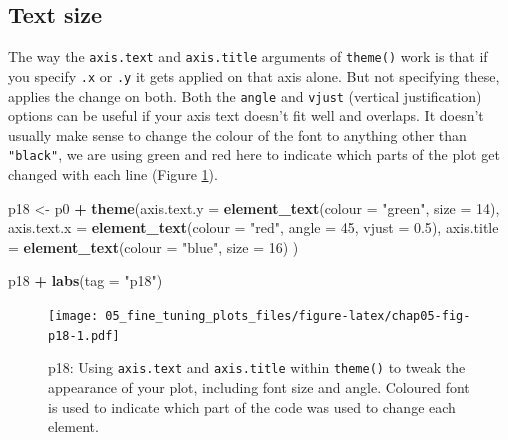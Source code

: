 \documentclass[
  12pt,
  krantz2]{krantz}
\makeatletter
\newenvironment{Shaded}{\begin{snugshade}}{\end{snugshade}}
\newcommand{\DataTypeTok}[1]{\textcolor[rgb]{0.13,0.29,0.53}{#1}}
\newcommand{\DecValTok}[1]{\textcolor[rgb]{0.00,0.00,0.81}{#1}}
\newcommand{\FloatTok}[1]{\textcolor[rgb]{0.00,0.00,0.81}{#1}}
\newcommand{\KeywordTok}[1]{\textcolor[rgb]{0.13,0.29,0.53}{\textbf{#1}}}
\newcommand{\NormalTok}[1]{#1}
\newcommand{\OperatorTok}[1]{\textcolor[rgb]{0.81,0.36,0.00}{\textbf{#1}}}
\newcommand{\StringTok}[1]{\textcolor[rgb]{0.31,0.60,0.02}{#1}}
\newenvironment{kframe}{%
\medskip{}
\setlength{\fboxsep}{.8em}
 \def\at@end@of@kframe{}%
 \ifinner\ifhmode%
  \def\at@end@of@kframe{\end{minipage}}%
  \begin{minipage}{\columnwidth}%
 \fi\fi%
 \def\FrameCommand##1{\hskip\@totalleftmargin \hskip-\fboxsep
 \colorbox{shadecolor}{##1}\hskip-\fboxsep
     \hskip-\linewidth \hskip-\@totalleftmargin \hskip\columnwidth}%
 \MakeFramed {\advance\hsize-\width
   \@totalleftmargin\z@ \linewidth\hsize
   \@setminipage}}%
 {\par\unskip\endMakeFramed%
 \at@end@of@kframe}
\renewenvironment{Shaded}{\begin{kframe}}{\end{kframe}}
\makeatother
\begin{document}
\hypertarget{text-size}{%
\subsection{Text size}\label{text-size}}


The way the \texttt{axis.text} and \texttt{axis.title} arguments of \texttt{theme()} work is that if you specify \texttt{.x} or \texttt{.y} it gets applied on that axis alone.
But not specifying these, applies the change on both.
Both the \texttt{angle} and \texttt{vjust} (vertical justification) options can be useful if your axis text doesn't fit well and overlaps.
It doesn't usually make sense to change the colour of the font to anything other than \texttt{"black"}, we are using green and red here to indicate which parts of the plot get changed with each line (Figure \ref{fig:chap05-fig-p18}).

\begin{Shaded}
\begin{Highlighting}[]
\NormalTok{p18 <-}\StringTok{  }\NormalTok{p0 }\OperatorTok{+}
\StringTok{  }\KeywordTok{theme}\NormalTok{(}\DataTypeTok{axis.text.y =} \KeywordTok{element_text}\NormalTok{(}\DataTypeTok{colour =} \StringTok{"green"}\NormalTok{, }\DataTypeTok{size =} \DecValTok{14}\NormalTok{),}
        \DataTypeTok{axis.text.x =} \KeywordTok{element_text}\NormalTok{(}\DataTypeTok{colour =} \StringTok{"red"}\NormalTok{,  }\DataTypeTok{angle =} \DecValTok{45}\NormalTok{, }\DataTypeTok{vjust =} \FloatTok{0.5}\NormalTok{),}
        \DataTypeTok{axis.title  =} \KeywordTok{element_text}\NormalTok{(}\DataTypeTok{colour =} \StringTok{"blue"}\NormalTok{, }\DataTypeTok{size =} \DecValTok{16}\NormalTok{)}
\NormalTok{        )}

\NormalTok{p18 }\OperatorTok{+}\StringTok{ }\KeywordTok{labs}\NormalTok{(}\DataTypeTok{tag =} \StringTok{"p18"}\NormalTok{)}
\end{Highlighting}
\end{Shaded}

\begin{figure}
\centering
\texttt{[image: 05\_fine\_tuning\_plots\_files/figure-latex/chap05-fig-p18-1.pdf]}
\caption{\label{fig:chap05-fig-p18}p18: Using \texttt{axis.text} and \texttt{axis.title} within \texttt{theme()} to tweak the appearance of your plot, including font size and angle. Coloured font is used to indicate which part of the code was used to change each element.}
\end{figure}
\end{document}
